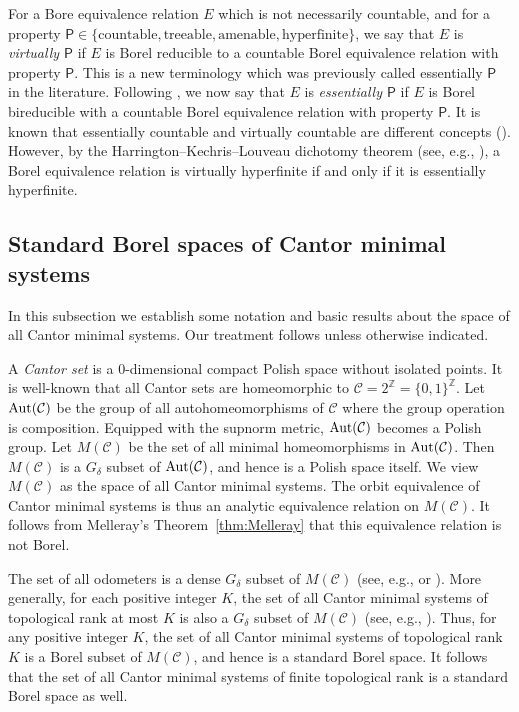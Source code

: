 \documentclass{amsart}
\theoremstyle{definition}
\theoremstyle{problem}
\theoremstyle{remark}
\numberwithin{equation}{section}
\newcommand{\Aut}{\mbox{\rm Aut}}
\begin{document}
For a Bore equivalence relation $E$ which is not necessarily countable, and for a property $\mathsf{P}\in \{\mbox{countable}, \mbox{treeable}, \mbox{amenable}, \mbox{hyperfinite}\}$, we say that $E$ is {\em virtually $\mathsf{P}$} if $E$ is Borel reducible to a countable Borel equivalence relation with property $\mathsf{P}$. This is a new terminology which was previously called essentially $\mathsf{P}$ in the literature. Following \cite[Section 4.1]{KechrisBookNew}, we now say that $E$ is {\em essentially $\mathsf{P}$} if $E$ is Borel bireducible with a countable Borel equivalence relation with property $\mathsf{P}$. It is known that essentially countable and virtually countable are different concepts (\cite{Hj}). However, by the Harrington--Kechris--Louveau dichotomy theorem (see, e.g., \cite[Theorem 6.3.1]{GaoBook}), a Borel equivalence relation is virtually hyperfinite if and only if it is essentially hyperfinite.


\subsection{Standard Borel spaces of Cantor minimal systems}
In this subsection we establish some notation and basic results about the space of all Cantor minimal systems. Our treatment follows \cite{GL} unless otherwise indicated.

A {\em Cantor set} is a $0$-dimensional compact Polish space without isolated points. It is well-known that all Cantor sets are homeomorphic to $\mathcal{C}=2^{\mathbb{Z}}=\{0,1\}^\mathbb{Z}$. Let $\Aut(\mathcal{C})$ be the group of all autohomeomorphisms of $\mathcal{C}$ where the group operation is composition. Equipped with the supnorm metric, $\Aut(\mathcal{C})$ becomes a Polish group. Let $M(\mathcal{C})$ be the set of all minimal homeomorphisms in $\Aut(\mathcal{C})$. Then $M(\mathcal{C})$ is a $G_\delta$ subset of $\Aut(\mathcal{C})$, and hence is a Polish space itself. We view $M(\mathcal{C})$ as the space of all Cantor minimal systems. The orbit equivalence of Cantor minimal systems is thus an analytic equivalence relation on $M(\mathcal{C})$. It follows from Melleray's Theorem~\ref{thm:Melleray} that this equivalence relation is not Borel.

The set of all odometers is a dense $G_\delta$ subset of $M(\mathcal{C})$ (see, e.g., \cite[Proposition 3.6]{GL} or \cite[Lemma 4.1]{Melleray}). More generally, for each positive integer $K$, the set of all Cantor minimal systems of topological rank at most $K$ is also a $G_\delta$ subset of $M(\mathcal{C})$ (see, e.g., \cite[Corollary 3.4]{GL}). 
Thus, for any positive integer $K$, the set of all Cantor minimal systems of topological rank $K$ is a Borel subset of $M(\mathcal{C})$, and hence is a standard Borel space. It follows that the set of all Cantor minimal systems of finite topological rank is a standard Borel space as well.
\end{document}
